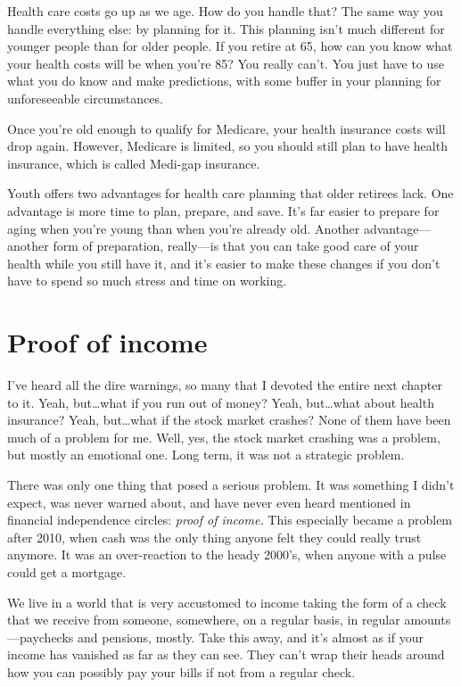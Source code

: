 Health care costs go up as we age. How do you handle that? The same way you handle everything else: by planning for it. This planning isn't much different for younger people than for older people. If you retire at 65, how can you know what your health costs will be when you're 85? You really can't. You just have to use what you do know and make predictions, with some buffer in your planning for unforeseeable circumstances.

Once you're old enough to qualify for Medicare, your health insurance costs will drop again. However, Medicare is limited, so you should still plan to have health insurance, which is called Medi-gap insurance.

Youth offers two advantages for health care planning that older retirees lack. One advantage is more time to plan, prepare, and save. It's far easier to prepare for aging when you're young than when you're already old. Another advantage---another form of preparation, really---is that you can take good care of your health while you still have it, and it's easier to make these changes if you don't have to spend so much stress and time on working.

\section{Proof of income}
I've heard all the dire warnings, so many that I devoted the entire next chapter to it. Yeah, but\ldots what if you run out of money? Yeah, but\ldots what about health insurance? Yeah, but\ldots what if the stock market crashes? None of them have been much of a problem for me. Well, yes, the stock market crashing was a problem, but mostly an emotional one. Long term, it was not a strategic problem.

There was only one thing that posed a serious problem. It was something I didn't expect, was never warned about, and have never even heard mentioned in financial independence circles: \emph{proof of income.} This especially became a problem after 2010, when cash was the only thing anyone felt they could really trust anymore. It was an over-reaction to the heady 2000's, when anyone with a pulse could get a mortgage.

We live in a world that is very accustomed to income taking the form of a check that we receive from someone, somewhere, on a regular basis, in regular amounts---paychecks and pensions, mostly. Take this away, and it's almost as if your income has vanished as far as they can see. They can't wrap their heads around how you can possibly pay your bills if not from a regular check.

